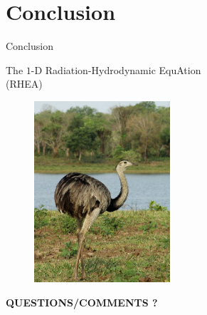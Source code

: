 \documentclass[xcolor=dvipsnames,10pt]{beamer}
\begin{document}
\section{Conclusion}
\begin{frame}{Conclusion}

\end{frame}
\begin{frame}{}
\begin{center}
The $1$-D Radiation-Hydrodynamic EquAtion \\
(RHEA)
\end{center}
\begin{figure}[H]
\centering
\includegraphics[width=0.45\textwidth]{../figures/rhea.png}
\end{figure}
\end{frame}
\begin{frame}{}
\begin{center}
\LARGE{\textbf{QUESTIONS/COMMENTS ?}}
\end{center}
\end{frame}
\end{document}

